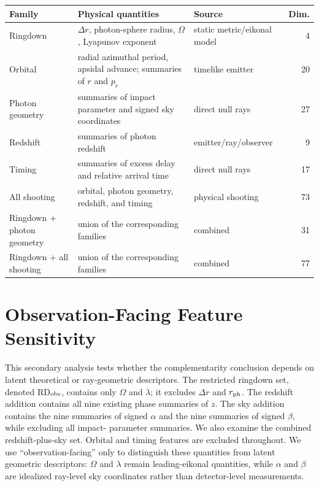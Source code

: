 \documentclass[11pt]{article}
\begin{document}
\begin{center}
\begin{minipage}{.96\textwidth}
\label{tab:features}
\centering
\scriptsize
\setlength{\tabcolsep}{3pt}
\begin{tabular}{p{.23\linewidth}p{.43\linewidth}p{.18\linewidth}r}
Family & Physical quantities & Source & Dim. \\
\hline
Ringdown & $\Delta r$, photon-sphere radius, $\Omega$, Lyapunov exponent & static metric/eikonal model & 4 \\
Orbital & radial azimuthal period, apsidal advance; summaries of $r$ and $p_r$ & timelike emitter & 20 \\
Photon geometry & summaries of impact parameter and signed sky coordinates & direct null rays & 27 \\
Redshift & summaries of photon redshift & emitter/ray/observer & 9 \\
Timing & summaries of excess delay and relative arrival time & direct null rays & 17 \\
All shooting & orbital, photon geometry, redshift, and timing & physical shooting & 73 \\
Ringdown + photon geometry & union of the corresponding families & combined & 31 \\
Ringdown + all shooting & union of the corresponding families & combined & 77 \\
\end{tabular}
\end{minipage}
\end{center}

\section{Observation-Facing Feature Sensitivity}
\label{app:observation-facing}
This secondary analysis tests whether the complementarity conclusion depends
on latent theoretical or ray-geometric descriptors. The restricted ringdown
set, denoted RD$_{\rm obs}$, contains only $\Omega$ and $\lambda$; it excludes
$\Delta r$ and $r_{\rm ph}$. The redshift addition contains all nine existing
phase summaries of $z$. The sky addition contains the nine summaries of signed
$\alpha$ and the nine summaries of signed $\beta$, while excluding all impact-
parameter summaries. We also examine the combined redshift-plus-sky set.
Orbital and timing features are excluded throughout. We use
``observation-facing'' only to distinguish these quantities from latent
geometric descriptors: $\Omega$ and $\lambda$ remain leading-eikonal
quantities, while $\alpha$ and $\beta$ are idealized ray-level sky coordinates
rather than detector-level measurements.
\end{document}
